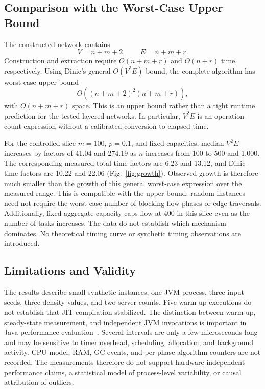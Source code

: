 \subsection{Comparison with the Worst-Case Upper Bound}
The constructed network contains
\begin{equation}
V=n+m+2,\qquad E=n+m+r.
\end{equation}
Construction and extraction require $O(n+m+r)$ and $O(n+r)$ time,
respectively. Using Dinic's general $O(V^2E)$ bound, the complete algorithm
has worst-case upper bound
\begin{equation}
O\!\left((n+m+2)^2(n+m+r)\right),
\end{equation}
with $O(n+m+r)$ space. This is an upper bound rather than a tight runtime
prediction for the tested layered networks. In particular, $V^2E$ is an
operation-count expression without a calibrated conversion to elapsed time.

For the controlled slice $m=100$, $p=0.1$, and fixed capacities, median
$V^2E$ increases by factors of 41.04 and 274.19 as $n$ increases from
100 to 500 and 1,000. The corresponding measured total-time factors are
6.23 and 13.12, and Dinic-time factors are 10.22 and 22.06
(Fig.~\ref{fig:growth}). Observed growth is therefore much smaller than the
growth of this general worst-case expression over the measured range.
This is compatible with the upper bound: random instances need not require
the worst-case number of blocking-flow phases or edge traversals. Additionally,
fixed aggregate capacity caps flow at 400 in this slice even as the number
of tasks increases. The data do not establish which mechanism dominates.
No theoretical timing curve or synthetic timing observations are introduced.

\subsection{Limitations and Validity}
The results describe small synthetic instances, one JVM process, three input
seeds, three density values, and two server counts. Five warm-up executions
do not establish that JIT compilation stabilized. The distinction between
warm-up, steady-state measurement, and independent JVM invocations is
important in Java performance evaluation~\cite{georges2007}. Several intervals are only
a few microseconds long and may be sensitive to timer overhead, scheduling,
allocation, and background activity. CPU model, RAM, GC events, and per-phase
algorithm counters are not recorded. The measurements therefore do not
support hardware-independent performance claims, a statistical model of
process-level variability, or causal attribution of outliers.

